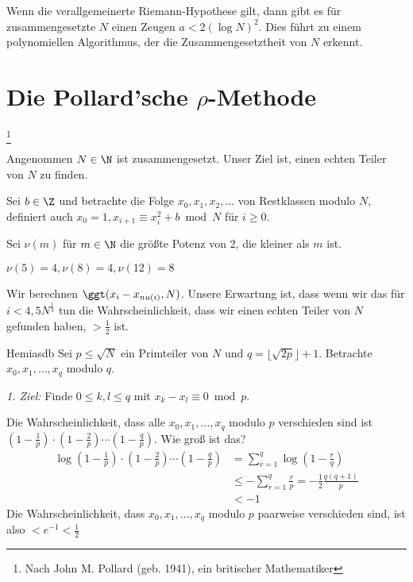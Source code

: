 \begin{rem*}
	Wenn die verallgemeinerte Riemann-Hypothese gilt, dann gibt es für zusammengesetzte $N$ einen Zeugen $a < 2(\log N)^2$. Dies führt zu einem polynomiellen Algorithmus, der die Zusammengesetztheit von $N$ erkennt.
\end{rem*}

\section{Die Pollard'sche $\rho$-Methode}
\footnote{Nach John M. Pollard (geb. 1941), ein britischer Mathematiker}

Angenommen $N \in \N$ ist zusammengesetzt. Unser Ziel ist, einen echten Teiler von $N$ zu finden.

Sei $b \in \Z$ und betrachte die Folge $x_0,x_1,x_2,\dotsc$ von Restklassen modulo $N$, definiert auch $x_0 = 1, x_{i+1} \equiv x_i^2+b \bmod N$ für $i \geq 0$.

Sei $\nu(m)$ für $m \in \N$ die größte Potenz von 2, die kleiner als $m$ ist.

\begin{exmp*}
	\( \nu(5)=4, \nu(8)=4,\nu(12)=8 \)
\end{exmp*}

Wir berechnen $\ggt(x_i-x_{nu(i)}, N)$. Unsere Erwartung ist, dass wenn wir das für $i < 4,5 N^{\frac{1}{4}}$ tun die Wahrscheinlichkeit, dass wir einen echten Teiler von $N$ gefunden haben, $> \frac{1}{2}$ ist.

Hemiasdb Sei $p \leq \sqrt{N}$ ein Primteiler von $N$ und $q = \lfloor\sqrt{2p}\rfloor + 1$. Betrachte $x_0,x_1,\dotsc,x_q$ modulo $q$.

\emph{1. Ziel:} Finde $0 \leq k, l \leq q$ mit $x_k-x_l \equiv  0 \bmod p$.

Die Wahrscheinlichkeit, dass alle $x_0,x_1,\dotsc,x_q$ modulo $p$ verschieden sind ist $\left( 1-\frac{1}{p} \right) \cdot \left( 1-\frac{2}{p} \right) \dotsm \left( 1-\frac{q}{p} \right)$. Wie groß ist das?
\begin{align*}
	\log \left( 1-\frac{1}{p} \right) \cdot \left( 1-\frac{2}{p} \right) \dotsm \left( 1-\frac{q}{p} \right) &= \sum_{r=1}^q \log \left( 1 - \frac{r}{q} \right)\\
	&\leq - \sum_{r=1}^q \frac{r}{p} = -\frac{1}{2} \frac{q(q+1)}{p}\\
	&< -1
\end{align*}
Die Wahrscheinlichkeit, dass $x_0,x_1,\dotsc,x_q$ modulo $p$ paarweise verschieden sind, ist also $< e^{-1}<\frac{1}{2}$

